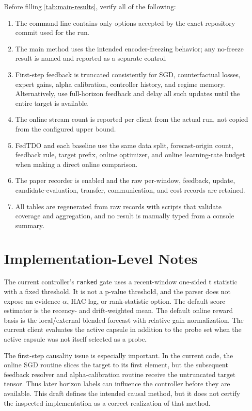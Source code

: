 \documentclass{article}
\theoremstyle{definition}
\begin{document}
Before filling \cref{tab:main-results}, verify all of the following:
\begin{enumerate}
  \item The command line contains only options accepted by the exact repository commit used for the run.
  \item The main method uses the intended encoder-freezing behavior; any no-freeze result is named and reported as a separate control.
  \item First-step feedback is truncated consistently for SGD, counterfactual losses, expert gains, alpha calibration, controller history, and regime memory. Alternatively, use full-horizon feedback and delay all such updates until the entire target is available.
  \item The online stream count is reported per client from the actual run, not copied from the configured upper bound.
  \item FedTDO and each baseline use the same data split, forecast-origin count, feedback rule, target prefix, online optimizer, and online learning-rate budget when making a direct online comparison.
  \item The paper recorder is enabled and the raw per-window, feedback, update, candidate-evaluation, transfer, communication, and cost records are retained.
  \item All tables are regenerated from raw records with scripts that validate coverage and aggregation, and no result is manually typed from a console summary.
\end{enumerate}

\section{Implementation-Level Notes}

The current controller's \texttt{ranked} gate uses a recent-window one-sided t statistic with a fixed threshold. It is not a p-value threshold, and the parser does not expose an evidence \(\alpha\), HAC lag, or rank-statistic option. The default score estimator is the recency- and drift-weighted mean. The default online reward basis is the local/external blended forecast with relative gain normalization. The current client evaluates the active capsule in addition to the probe set when the active capsule was not itself selected as a probe.

The first-step causality issue is especially important. In the current code, the online SGD routine slices the target to its first element, but the subsequent feedback resolver and alpha-calibration routine receive the untruncated target tensor. Thus later horizon labels can influence the controller before they are available. This draft defines the intended causal method, but it does not certify the inspected implementation as a correct realization of that method.
\end{document}
